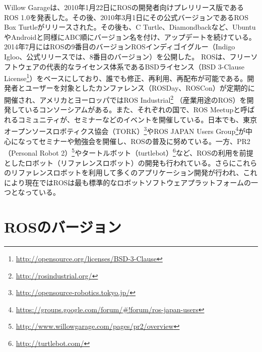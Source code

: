 Willow Garageは、2010年1月22日にROSの開発者向けプレリリース版であるROS 1.0を発表した。その後、2010年3月1日にその公式バージョンであるROS Box Turtleがリリースされた。その後も、C Turtle、Diamondbackなど、UbuntuやAndroidと同様にABC順にバージョン名を付け、アップデートを続けている。 2014年7月にはROSの9番目のバージョンROSインディゴイグルー（Indigo Igloo、公式リリースでは、8番目のバージョン）を公開した。
ROSは、フリーソフトウェアの代表的なライセンス体系であるBSDライセンス（BSD 3-Clause License\footnote{\url{http://opensource.org/licenses/BSD-3-Clause}}）をベースにしており、誰でも修正、再利用、再配布が可能である。開発者とユーザーを対象としたカンファレンス（ROSDay、ROSCon）が定期的に開催され、アメリカとヨーロッパではROS Industrial\footnote{\url{http://rosindustrial.org/}} （産業用途のROS）を開発しているコンソーシアムがある。また、それぞれの国で、ROS Meetupと呼ばれるコミュニティが、セミナーなどのイベントを開催している。日本でも、東京オープンソースロボティクス協会（TORK）\footnote{\url{http://opensource-robotics.tokyo.jp/}}やROS JAPAN Users Group\footnote{\url{https://groups.google.com/forum/#!forum/ros-japan-users}}が中心になってセミナーや勉強会を開催し、ROSの普及に努めている。一方、PR2（Personal Robot 2）\footnote{\url{http://www.willowgarage.com/pages/pr2/overview}}やタートルボット（turtlebot）\footnote{\url{http://turtlebot.com/}}など、ROSの利用を前提としたロボット（リファレンスロボット）の開発も行われている。さらにこれらのリファレンスロボットを利用して多くのアプリケーション開発が行われ、これにより現在ではROSは最も標準的なロボットソフトウェアプラットフォームの一つとなっている。

\section{ROSのバージョン}

